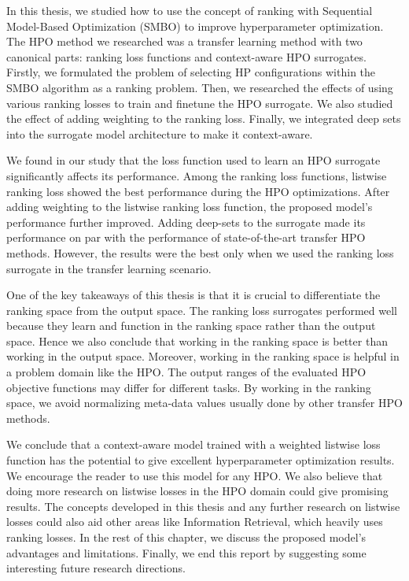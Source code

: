 \documentclass[12pt, twoside, ngerman]{report}
\begin{document}
In this thesis, we studied how to use the concept of ranking with Sequential Model-Based Optimization (SMBO) to improve hyperparameter optimization. The HPO method we researched was a transfer learning method with two canonical parts: ranking loss functions and context-aware HPO surrogates. Firstly, we formulated the problem of selecting HP configurations within the SMBO algorithm as a ranking problem. Then, we researched the effects of using various ranking losses to train and finetune the HPO surrogate. We also studied the effect of adding weighting to the ranking loss. Finally, we integrated deep sets into the surrogate model architecture to make it context-aware.

We found in our study that the loss function used to learn an HPO surrogate significantly affects its performance. Among the ranking loss functions, listwise ranking loss showed the best performance during the HPO optimizations. After adding weighting to the listwise ranking loss function, the proposed model's performance further improved. Adding deep-sets to the surrogate made its performance on par with the performance of state-of-the-art transfer HPO methods. However, the results were the best only when we used the ranking loss surrogate in the transfer learning scenario.

One of the key takeaways of this thesis is that it is crucial to differentiate the ranking space from the output space. The ranking loss surrogates performed well because they learn and function in the ranking space rather than the output space. Hence we also conclude that working in the ranking space is better than working in the output space. Moreover, working in the ranking space is helpful in a problem domain like the HPO. The output ranges of the evaluated HPO objective functions may differ for different tasks. By working in the ranking space, we avoid normalizing meta-data values usually done by other transfer HPO methods.

We conclude that a context-aware model trained with a weighted listwise loss function has the potential to give excellent hyperparameter optimization results. We encourage the reader to use this model for any HPO. We also believe that doing more research on listwise losses in the HPO domain could give promising results. The concepts developed in this thesis and any further research on listwise losses could also aid other areas like Information Retrieval, which heavily uses ranking losses. In the rest of this chapter, we discuss the proposed model's advantages and limitations. Finally, we end this report by suggesting some interesting future research directions.
\end{document}
